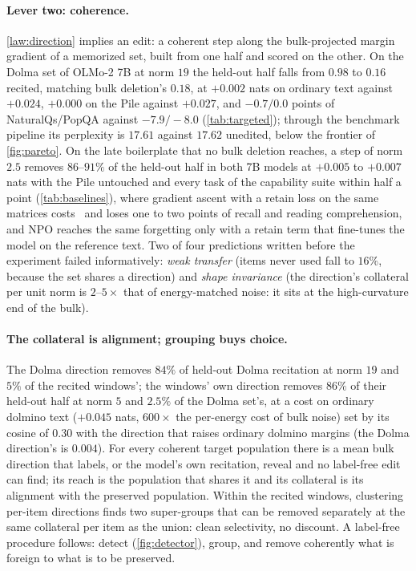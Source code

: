\documentclass{article}
\theoremstyle{definition}\newtheorem{law}{Empirical law}
\begin{document}
\paragraph{Lever two: coherence.} \cref{law:direction} implies an edit: a coherent step along the bulk-projected margin gradient of a memorized set, built from one half and scored on the other. On the Dolma set of OLMo-2 7B at norm $19$ the held-out half falls from $0.98$ to $0.16$ recited, matching bulk deletion's $0.18$, at $+0.002$ nats on ordinary text against $+0.024$, $+0.000$ on the Pile against $+0.027$, and $-0.7/0.0$ points of NaturalQs/PopQA against $-7.9/-8.0$ (\cref{tab:targeted}); through the benchmark pipeline its perplexity is $17.61$ against $17.62$ unedited, below the frontier of \cref{fig:pareto}. On the late boilerplate that no bulk deletion reaches, a step of norm $2.5$ removes $86$--$91\%$ of the held-out half in both 7B models at $+0.005$ to $+0.007$ nats with the Pile untouched and every task of the capability suite within half a point (\cref{tab:baselines}), where gradient ascent with a retain loss on the same matrices costs \baselineCost\ and loses one to two points of recall and reading comprehension, and NPO \citep{zhang2024negative} reaches the same forgetting only with a retain term that fine-tunes the model on the reference text. Two of four predictions written before the experiment failed informatively: \emph{weak transfer} (items never used fall to $16\%$, because the set shares a direction) and \emph{shape invariance} (the direction's collateral per unit norm is $2$--$5\times$ that of energy-matched noise: it sits at the high-curvature end of the bulk).

\paragraph{The collateral is alignment; grouping buys choice.} The Dolma direction removes $84\%$ of held-out Dolma recitation at norm $19$ and $5\%$ of the recited windows'; the windows' own direction removes $86\%$ of their held-out half at norm $5$ and $2.5\%$ of the Dolma set's, at a cost on ordinary dolmino text ($+0.045$ nats, $600\times$ the per-energy cost of bulk noise) set by its cosine of $0.30$ with the direction that raises ordinary dolmino margins (the Dolma direction's is $0.004$). For every coherent target population there is a mean bulk direction that labels, or the model's own recitation, reveal and no label-free edit can find; its reach is the population that shares it and its collateral is its alignment with the preserved population. Within the recited windows, clustering per-item directions finds two super-groups that can be removed separately at the same collateral per item as the union: clean selectivity, no discount. A label-free procedure follows: detect (\cref{fig:detector}), group, and remove coherently what is foreign to what is to be preserved.
\end{document}
